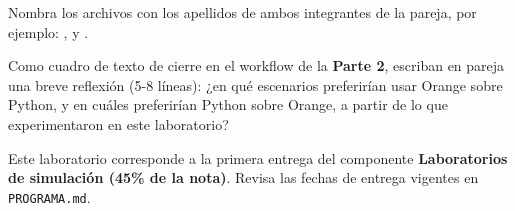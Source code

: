 \documentclass[11pt,letterpaper]{article}
\newcommand{\faPencil}{\raisebox{-0.1em}{\textbf{\Large\textbullet}}}
\begin{document}
Nombra los archivos con los apellidos de ambos integrantes de la pareja, por ejemplo: \texttt{}, \texttt{} y \texttt{}.

\begin{actividad}[title={\faPencil\ Reflexión final}]
Como cuadro de texto de cierre en el workflow de la \textbf{Parte 2}, escriban en pareja una breve reflexión (5-8 líneas): ¿en qué escenarios preferirían usar Orange sobre Python, y en cuáles preferirían Python sobre Orange, a partir de lo que experimentaron en este laboratorio?
\end{actividad}

\begin{nota}
Este laboratorio corresponde a la primera entrega del componente \textbf{Laboratorios de simulación (45\% de la nota)}. Revisa las fechas de entrega vigentes en \texttt{PROGRAMA.md}.
\end{nota}
\end{document}
